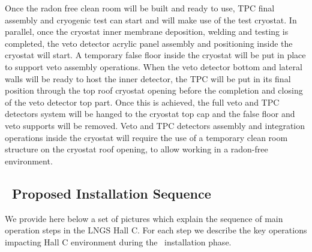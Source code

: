Once the radon free clean room will be built and ready to use, TPC final assembly and
cryogenic test can start and will make use of the test cryostat. In parallel, once the cryostat inner membrane deposition, welding and testing is completed, the veto detector acrylic panel assembly and positioning inside the cryostat will start. A temporary false floor inside the cryostat will be put in place to support veto assembly operations. When the veto detector bottom and lateral walls will be ready to host the inner detector, the TPC will be put in its final position through the top roof cryostat opening before the completion and closing of the veto detector top part. Once this is achieved, the full veto and TPC detectors system will be hanged to the cryostat top cap and the false floor and veto supports will be removed. Veto and TPC detectors assembly and
integration operations inside the cryostat will require the use of a temporary clean room
structure on the cryostat roof opening, to allow working in a radon-free environment.

\subsection{\DSks\ Proposed Installation Sequence}
\label{sec:InstallationSequence}

We provide here below a set of pictures which explain the sequence of main operation steps in the LNGS Hall C. For each step we describe the key operations impacting Hall C
environment during the \DSks\ installation phase.\par

